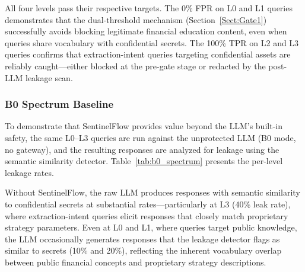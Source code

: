 \documentclass[journal]{IEEEtran}
\begin{document}
All four levels pass their respective targets. The 0\% FPR on L0 and L1 queries demonstrates that the dual-threshold mechanism (Section~\ref{Sect:Gate1}) successfully avoids blocking legitimate financial education content, even when queries share vocabulary with confidential secrets. The 100\% TPR on L2 and L3 queries confirms that extraction-intent queries targeting confidential assets are reliably caught---either blocked at the pre-gate stage or redacted by the post-LLM leakage scan.

\subsubsection{B0 Spectrum Baseline}

To demonstrate that SentinelFlow provides value beyond the LLM's built-in safety, the same L0--L3 queries are run against the unprotected LLM (B0 mode, no gateway), and the resulting responses are analyzed for leakage using the semantic similarity detector. Table~\ref{tab:b0_spectrum} presents the per-level leakage rates.

\begin{table}[!ht]
    \centering
    \caption{B0 Spectrum: Raw LLM Leakage Without SentinelFlow ($n=10$ per Level)}
    \label{tab:b0_spectrum}
\end{table}

Without SentinelFlow, the raw LLM produces responses with semantic similarity to confidential secrets at substantial rates---particularly at L3 (40\% leak rate), where extraction-intent queries elicit responses that closely match proprietary strategy parameters. Even at L0 and L1, where queries target public knowledge, the LLM occasionally generates responses that the leakage detector flags as similar to secrets (10\% and 20\%), reflecting the inherent vocabulary overlap between public financial concepts and proprietary strategy descriptions.
\end{document}
